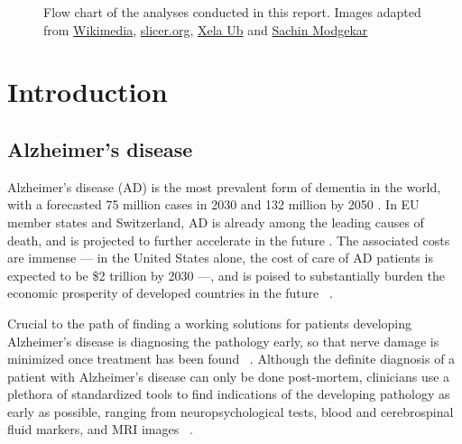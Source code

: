 \documentclass{article}
\begin{document}
\begin{figure}[b]
  \caption{Flow chart of the analyses conducted in this report. Images adapted from \href{https://commons.wikimedia.org/wiki/Brain/media/File:MRI_head_side.jpg}{Wikimedia},
\href{https://www.slicer.org/wiki/Documentation/Nightly/Modules/BrainVolumeRefinement}{ slicer.org}, \href{https://thenounproject.com/xela./collection/diagrams/?i=486221}{Xela Ub} and
\href{https://thenounproject.com/smodgekar/collection/data-classify/}{Sachin Modgekar}}
\end{figure}

\section{Introduction}

\subsection{Alzheimer's disease}\label{sec:ad_context}

Alzheimer's disease (AD) is the most prevalent form of dementia in the world, with a forecasted 75 million cases in 2030 and 132 million by 2050 \citep{world2017global}. In EU member states and Switzerland, AD is already among the leading causes of death, and is projected to further accelerate in the future \citep{sleeman2019escalating}. The associated costs are immense --- in the United States alone, the cost of care of AD patients is expected to be \$2 trillion by 2030 ---, and is poised to substantially burden the economic prosperity of developed countries in the future ~\citep{world2017global}.

Crucial to the path of finding a working solutions for patients developing Alzheimer's disease is diagnosing the pathology early, so that nerve damage is minimized once treatment has been found ~\citep{yiannopoulou2020current}. Although the definite diagnosis of a patient with Alzheimer's disease can only be done post-mortem, clinicians use a plethora of standardized tools to find indications of the developing pathology as early as possible, ranging from neuropsychological tests, blood and cerebrospinal fluid markers, and MRI images ~\citep{mckhann2011diagnosis, lehmann2016biomarkers, smits2012early}.
\end{document}
